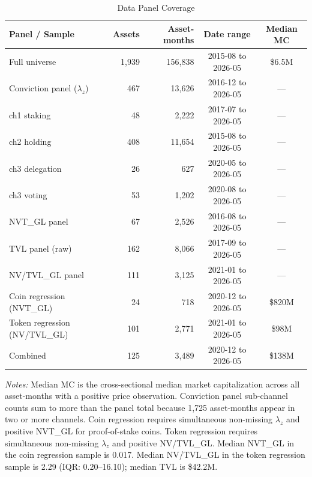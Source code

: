\documentclass[12pt]{article}
\begin{document}
\begin{table}[ht]
\centering
\caption{Data Panel Coverage}
\label{tab:coverage_appendix}
\small
\begin{tabular}{lrrcc}
\toprule
Panel / Sample & Assets & Asset-months & Date range & Median MC \\
\midrule
Full universe              & 1,939 & 156,838 & 2015-08 to 2026-05 & \$6.5M \\
Conviction panel ($\lambda_z$) & 467   & 13,626  & 2016-12 to 2026-05 & --- \\
\quad ch1 staking          & 48    & 2,222   & 2017-07 to 2026-05 & --- \\
\quad ch2 holding          & 408   & 11,654  & 2015-08 to 2026-05 & --- \\
\quad ch3 delegation       & 26    & 627     & 2020-05 to 2026-05 & --- \\
\quad ch3 voting           & 53    & 1,202   & 2020-08 to 2026-05 & --- \\
NVT\_GL panel              & 67    & 2,526   & 2016-08 to 2026-05 & --- \\
TVL panel (raw)            & 162   & 8,066   & 2017-09 to 2026-05 & --- \\
NV/TVL\_GL panel           & 111   & 3,125   & 2021-01 to 2026-05 & --- \\
\midrule
Coin regression (NVT\_GL)  & 24    & 718     & 2020-12 to 2026-05 & \$820M \\
Token regression (NV/TVL\_GL) & 101 & 2,771  & 2021-01 to 2026-05 & \$98M \\
Combined                   & 125   & 3,489   & 2020-12 to 2026-05 & \$138M \\
\bottomrule
\end{tabular}
\smallskip

\parbox{0.9\linewidth}{\footnotesize
\textit{Notes:} Median MC is the cross-sectional median market capitalization across all
asset-months with a positive price observation. Conviction panel sub-channel counts sum
to more than the panel total because 1,725 asset-months appear in two or more channels.
Coin regression requires simultaneous non-missing $\lambda_z$ and positive NVT\_GL for
proof-of-stake coins. Token regression requires simultaneous non-missing $\lambda_z$ and
positive NV/TVL\_GL. Median NVT\_GL in the coin regression sample is 0.017. Median
NV/TVL\_GL in the token regression sample is 2.29 (IQR: 0.20--16.10); median TVL is
\$42.2M.
}
\end{table}
\end{document}
